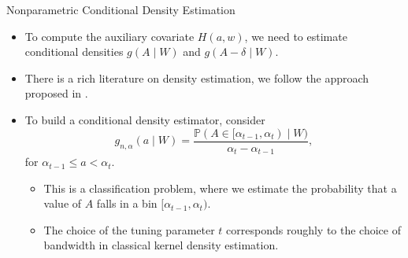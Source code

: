 \documentclass{beamer}
\newcommand{\pr}{\mathbb{P}}
\begin{document}

\begin{frame}[c]{Nonparametric Conditional Density Estimation}

\begin{center}
\begin{itemize}
  \itemsep8pt
  \item To compute the auxiliary covariate $H(a,w)$, we need to estimate
    conditional densities $g(A \mid W)$ and $g(A - \delta \mid W)$.
  \item There is a rich literature on density estimation, we follow the approach
    proposed in \cite{diaz2011super}.
  \item To build a conditional density estimator, consider
    \begin{equation*}
      g_{n, \alpha}(a \mid W) = \frac{\pr (A \in [\alpha_{t-1}, \alpha_t)
        \mid W)}{\alpha_t - \alpha_{t-1}},
    \end{equation*}
    for $\alpha_{t-1} \leq a < \alpha_t$.
    \vspace{0.5em}
    \begin{itemize}
      \itemsep4pt
      \item This is a classification problem, where we estimate the probability
        that a value of $A$ falls in a bin $[\alpha_{t-1}, \alpha_t)$.
      \item The choice of the tuning parameter $t$ corresponds roughly to the
        choice of bandwidth in classical kernel density estimation.
    \end{itemize}
\end{itemize}
\end{center}

\note{
}

\end{frame}

\end{document}
